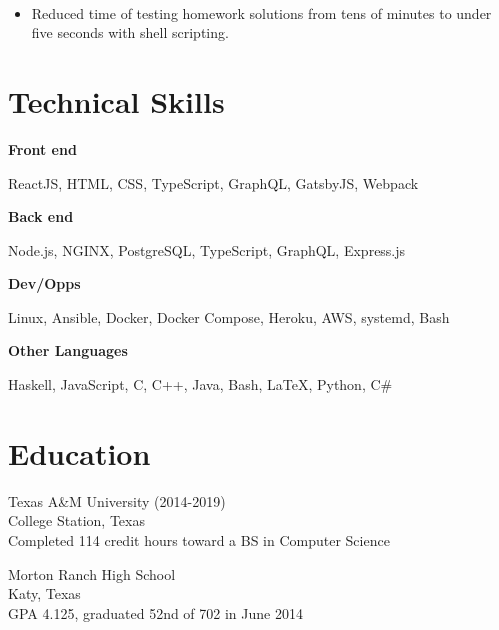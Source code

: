 \documentclass{resume}
\begin{document}
 \\

\begin{itemize}
    \item Reduced time of testing homework solutions from tens of minutes to
          under five seconds with shell scripting.
\end{itemize}

\section{Technical Skills}

\textbf{Front end}

ReactJS, HTML, CSS, TypeScript, GraphQL, GatsbyJS, Webpack

\textbf{Back end}

Node.js, NGINX, PostgreSQL, TypeScript, GraphQL, Express.js

\textbf{Dev/Opps}

Linux, Ansible, Docker, Docker Compose, Heroku, AWS, systemd, Bash

\textbf{Other Languages}

Haskell, JavaScript, C, C++, Java, Bash, \LaTeX, Python, C\#

\section{Education}

Texas A\&M University (2014-2019) \\
College Station, Texas \\
Completed 114 credit hours toward a BS in Computer Science

\vspace{1em}
Morton Ranch High School \\
Katy, Texas \\
GPA 4.125, graduated 52nd of 702 in June 2014
\end{document}
